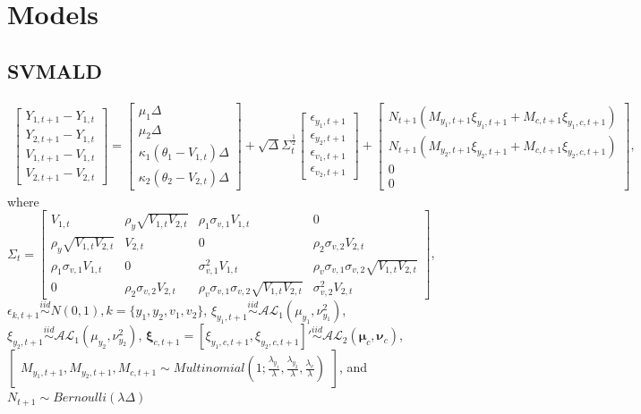 \documentclass{article}\usepackage[]{graphicx}\usepackage[]{color}
\begin{document}
\section{Models}

\subsection{SVMALD}

\begin{align}
    \begin{bmatrix} Y_{1,t + 1} - Y_{1,t} \\ Y_{2,t + 1} - Y_{1,t} \\ V_{1,t + 1} - V_{1,t} \\ V_{2,t + 1} - V_{2,t} \end{bmatrix} = \begin{bmatrix} \mu_1 \Delta \\ \mu_2 \Delta \\ \kappa_1(\theta_1 - V_{1,t}) \Delta \\ \kappa_2(\theta_2 - V_{2,t}) \Delta \end{bmatrix} + \sqrt{\Delta}\Sigma_t^{\frac{1}{2}} \begin{bmatrix} \epsilon_{y_1,t+1} \\ \epsilon_{y_2,t+1} \\ \epsilon_{v_1,t+1} \\ \epsilon_{v_2,t+1} \end{bmatrix} + \begin{bmatrix} N_{t+1}(M_{y_1,t+1} \xi_{y_1, t+1} + M_{c,t+1} \xi_{y_1,c,t+1}) \\ N_{t+1}(M_{y_2,t+1} \xi_{y_2, t+1} + M_{c,t+1} \xi_{y_2,c,t+1}) \\ 0 \\ 0 \end{bmatrix}, \label{S_tdisc_2d}
\end{align}
where $\Sigma_{t} = \begin{bmatrix} V_{1,t} & \rho_y \sqrt{V_{1,t}V_{2,t}} & \rho_1 \sigma_{v,1} V_{1,t} & 0 \\ \rho_y \sqrt{V_{1,t}V_{2,t}} & V_{2,t} & 0 & \rho_2 \sigma_{v,2} V_{2,t} \\ \rho_1 \sigma_{v,1} V_{1,t} & 0 & \sigma_{v,1}^2 V_{1,t} & \rho_v \sigma_{v,1}\sigma_{v,2} \sqrt{V_{1,t} V_{2,t}} \\ 0 & \rho_2 \sigma_{v,2} V_{2,t} & \rho_v \sigma_{v,1}\sigma_{v,2} \sqrt{V_{1,t} V_{2,t}} & \sigma_{v,2}^2 V_{2,t} \end{bmatrix}$, \\$\epsilon_{k,t+1} \overset{iid}{\sim} N(0,1), k = \{y_1,y_2,v_1,v_2\}$, $\xi_{y_1,t+1} \overset{iid}{\sim} \mathcal{AL}_1(\mu_{y_1}, \nu_{y_1}^2)$, $\xi_{y_2,t+1} \overset{iid}{\sim} \mathcal{AL}_1(\mu_{y_2}, \nu_{y_2}^2)$, $\boldsymbol{\xi}_{c,t+1} = [\xi_{y_1,c,t+1}, \xi_{y_2,c,t+1}]' \overset{iid}{\sim} \mathcal{AL}_2(\boldsymbol{\mu}_c, \boldsymbol{\nu}_c)$, $\begin{bmatrix}
M_{y_1,t+1},M_{y_2,t+1},M_{c,t+1} \sim Multinomial(1;\frac{\lambda_{y_1}}{\lambda},\frac{\lambda_{y_2}}{\lambda},\frac{\lambda_c}{\lambda})
\end{bmatrix}$, and $N_{t+1} \sim Bernoulli(\lambda\Delta)$
\end{document}
